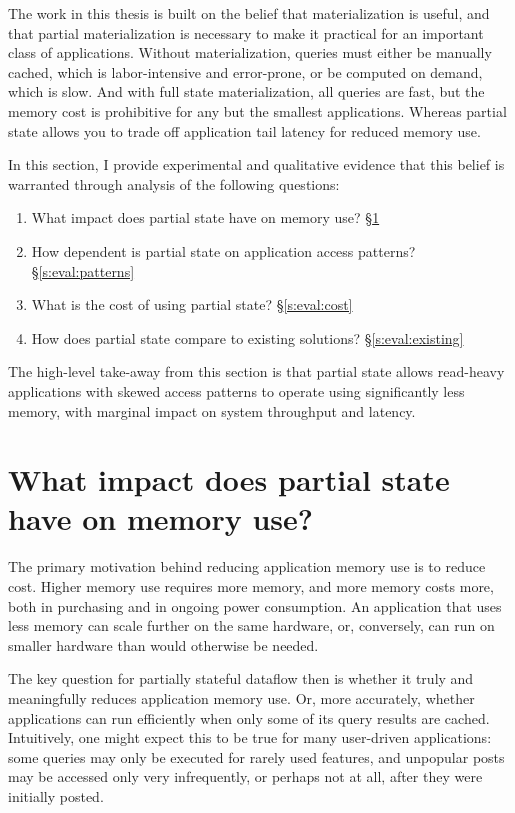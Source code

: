 The work in this thesis is built on the belief that materialization is useful,
and that partial materialization is necessary to make it practical for an
important class of applications. Without materialization, queries must either be
manually cached, which is labor-intensive and error-prone, or be computed on
demand, which is slow. And with full state materialization, all queries are
fast, but the memory cost is prohibitive for any but the smallest applications.
Whereas partial state allows you to trade off application tail latency for
reduced memory use.

In this section, I provide experimental and qualitative evidence that this
belief is warranted through analysis of the following questions:

\begin{enumerate}
 \item What impact does partial state have on memory use? \S\ref{s:eval:mem}
 \item How dependent is partial state on application access patterns? \S\ref{s:eval:patterns}
 \item What is the cost of using partial state? \S\ref{s:eval:cost}
 \item How does partial state compare to existing solutions? \S\ref{s:eval:existing}
\end{enumerate}

The high-level take-away from this section is that partial state allows
read-heavy applications with skewed access patterns to operate using
significantly less memory, with marginal impact on system throughput and
latency.

\section{What impact does partial state have on memory use?}
\label{s:eval:mem}

The primary motivation behind reducing application memory use is to reduce cost.
Higher memory use requires more memory, and more memory costs more, both in
purchasing and in ongoing power consumption. An application that uses less
memory can scale further on the same hardware, or, conversely, can run on
smaller hardware than would otherwise be needed.

The key question for partially stateful dataflow then is whether it truly and
meaningfully reduces application memory use. Or, more accurately, whether
applications can run efficiently when only some of its query results are cached.
Intuitively, one might expect this to be true for many user-driven applications:
some queries may only be executed for rarely used features, and unpopular posts
may be accessed only very infrequently, or perhaps not at all, after they were
initially posted.

